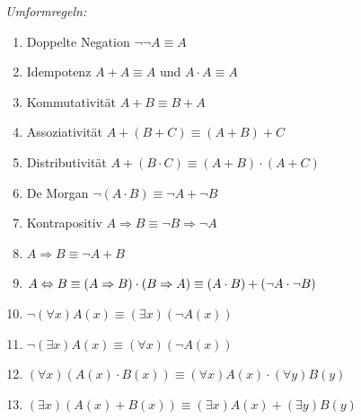 \documentclass[german,color,6pt]{latex4ei/latex4ei_sheet}
\begin{document}
\begin{emphbox}
\emph{Umformregeln:}
\begin{enumerate}
	\item Doppelte Negation $\neg \neg A \equiv A$
	\item Idempotenz $ A + A \equiv A$ und $ A \cdot A \equiv A$
	\item Kommutativität $A + B \equiv B + A$
	\item Assoziativität $A + (B + C) \equiv (A + B) + C$
	\item Distributivität $A + (B \cdot C) \equiv (A + B) \cdot (A + C)$
	\item De Morgan $\neg(A \cdot B) \equiv \neg A + \neg B$
	\item Kontrapositiv $A \Rightarrow B \equiv \neg B \Rightarrow \neg A$
	\item $ A \Rightarrow B \equiv \neg A + B$
	\item $ A \Leftrightarrow B \equiv (A \Rightarrow B ) \cdot (B \Rightarrow A) \equiv (A \cdot B) + (\neg A \cdot \neg B) $
	\item $ \neg (\forall x)A(x) \equiv (\exists x)(\neg A(x))$
	\item $ \neg (\exists x) A(x) \equiv (\forall x) (\neg{}A(x)) $
	\item $ (\forall x)(A(x) \cdot B(x)) \equiv (\forall x)A(x) \cdot (\forall y )B(y)$
	\item $ (\exists x)(A(x) + B(x)) \equiv (\exists x)A(x) + (\exists y)B(y)$
\end{enumerate}
\end{emphbox}
\end{document}
